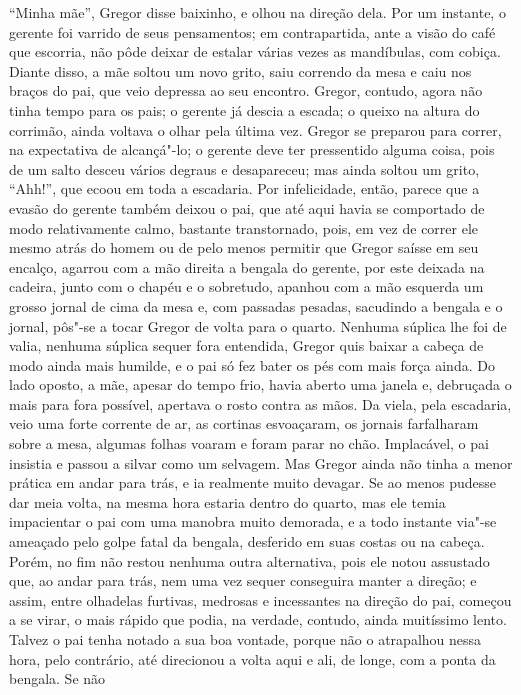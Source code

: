 “Minha mãe”, Gregor disse baixinho, e olhou na direção dela. Por um
instante, o gerente foi varrido de seus pensamentos; em contrapartida,
ante a visão do café que escorria, não pôde deixar de estalar várias vezes
as mandíbulas, com cobiça. Diante disso, a mãe soltou um novo grito, saiu
correndo da mesa e caiu nos braços do pai, que veio depressa ao seu
encontro. Gregor, contudo, agora não tinha tempo para os pais; o gerente
já descia a escada; o queixo na altura do corrimão, ainda voltava o olhar
pela última vez. Gregor se preparou para correr, na expectativa de alcançá"-lo;
o gerente deve ter pressentido alguma coisa, pois de um salto desceu
vários degraus e desapareceu; mas ainda soltou um grito, “Ahh!”, que ecoou
em toda a escadaria. Por infelicidade, então, parece que a evasão do
gerente também deixou o pai, que até aqui havia se comportado de modo
relativamente calmo, bastante transtornado, pois, em vez de
correr ele mesmo atrás do homem ou de pelo menos permitir que Gregor saísse em seu
encalço, agarrou com a mão direita a bengala do gerente, por este deixada
na cadeira, junto com o chapéu e o sobretudo, apanhou com a mão esquerda
um grosso jornal de cima da mesa e, com passadas pesadas, sacudindo a
bengala e o jornal, pôs"-se a tocar Gregor de volta para o quarto. Nenhuma
súplica lhe foi de valia, nenhuma súplica sequer fora entendida, Gregor
quis baixar a cabeça de modo ainda mais humilde, e o pai só fez bater os
pés com mais força ainda. Do lado oposto, a mãe, apesar do tempo frio,
havia aberto uma janela e, debruçada o mais para fora possível, apertava o
rosto contra as mãos. Da viela, pela escadaria, veio uma forte corrente de
ar, as cortinas esvoaçaram, os jornais farfalharam sobre a mesa, algumas
folhas voaram e foram parar no chão. Implacável, o pai insistia e passou a
silvar como um selvagem. Mas Gregor ainda não tinha a menor prática em
andar para trás, e ia realmente muito devagar. Se ao menos pudesse dar
meia volta, na mesma hora estaria dentro do quarto, mas ele temia
impacientar o pai com uma manobra muito demorada, e a todo instante via"-se
ameaçado pelo golpe fatal da bengala, desferido em suas costas ou na
cabeça. Porém, no fim não restou nenhuma outra alternativa, pois ele notou
assustado que, ao andar para trás, nem uma vez sequer conseguira manter a
direção; e assim, entre olhadelas furtivas, medrosas e incessantes na
direção do pai, começou a se virar, o mais rápido que podia, na
verdade, contudo, ainda muitíssimo lento. Talvez o pai tenha notado a sua boa
vontade, porque não o atrapalhou nessa hora, pelo contrário, até
direcionou a volta aqui e ali, de longe, com a ponta da bengala. Se não
